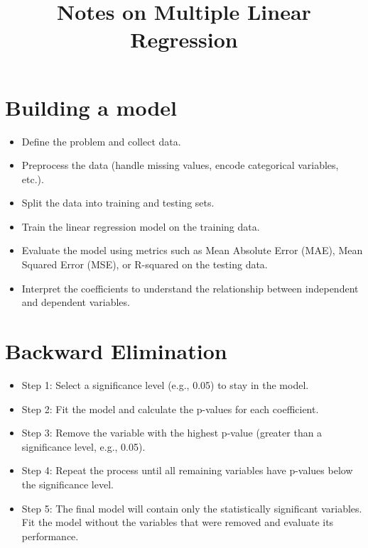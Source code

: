 \documentclass[conference]{IEEEtran}
\title{Notes on Multiple Linear Regression}
\author{
\IEEEauthorblockN{Luis Mendez}
}
\begin{document}
\maketitle

\section{Building a model}
\begin{itemize}
    \item Define the problem and collect data.
    \item Preprocess the data (handle missing values, encode categorical variables, etc.).
    \item Split the data into training and testing sets.
    \item Train the linear regression model on the training data.
    \item Evaluate the model using metrics such as Mean Absolute Error (MAE), Mean Squared Error (MSE), or R-squared on the testing data.
    \item Interpret the coefficients to understand the relationship between independent and dependent variables.
\end{itemize}

\section*{Backward Elimination}
\begin{itemize}
    \item Step 1: Select a significance level (e.g., 0.05) to stay in the model.
    \item Step 2: Fit the model and calculate the p-values for each coefficient.
    \item Step 3: Remove the variable with the highest p-value (greater than a significance level, e.g., 0.05).
    \item Step 4: Repeat the process until all remaining variables have p-values below the significance level.
    \item Step 5: The final model will contain only the statistically significant variables. Fit the model without the variables that were removed and evaluate its performance.
\end{itemize}
\end{document}
